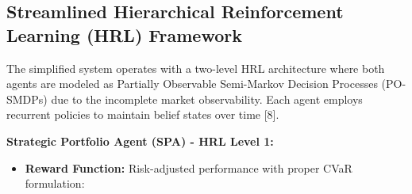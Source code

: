 \documentclass[11pt]{article}
\begin{document}
\subsection{Streamlined Hierarchical Reinforcement Learning (HRL) Framework}

The simplified system operates with a two-level HRL architecture where both agents are modeled as Partially Observable Semi-Markov Decision Processes (PO-SMDPs) due to the incomplete market observability. Each agent employs recurrent policies to maintain belief states over time [8].

\textbf{Strategic Portfolio Agent (SPA) - HRL Level 1:}

\begin{itemize}
\begin{equation}
\item   \textbf{State Space ($S_{\text{\1}}$):} ELTRA intelligence signals (forecasts, regime probabilities, confidence scores), current portfolio state $\mathbf{w}_{\text{\1}}\2, cash position, performance metrics, risk indicators, and market volatility measures.
\end{equation}

\begin{equation}
\item   \textbf{Action Space ($A_{\text{\1}}$):} Strategic allocation decisions including position sizing targets $\mathbf{w}^{target}$, risk exposure levels $\rho_{\text{\1}}$, rebalancing triggers, and risk constraint parameters passed to EOA.
\end{equation}

\item   \textbf{Reward Function:} Risk-adjusted performance with proper CVaR formulation:
\end{itemize}
\end{document}
